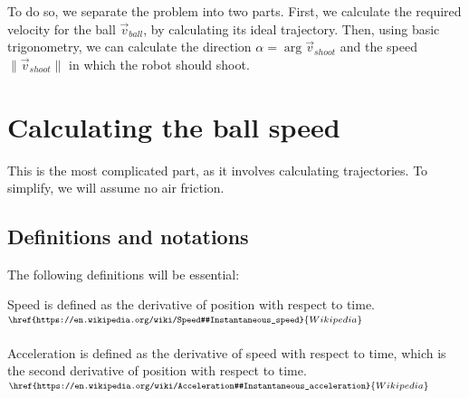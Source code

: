 \documentclass[11pt]{report}
\begin{document}
To do so, we separate the problem into two parts. First, we calculate the required velocity for the ball $\vec{v}_{ball}$, by calculating its ideal trajectory. Then, using basic trigonometry, we can calculate the direction $\alpha = \arg \vec{v}_{shoot}$ and the speed $\|\vec{v}_{shoot}\|$ in which the robot should shoot.


\section{Calculating the ball speed}

This is the most complicated part, as it involves calculating trajectories. To
simplify, we will assume no air friction.

\subsection{Definitions and notations}

The following definitions will be essential:
\begin{enumerate}[label={[\Alph*]}]
	\item\label{def:speed} Speed is defined as the derivative of position with respect to time. $^{\href{https://en.wikipedia.org/wiki/Speed#Instantaneous_speed}{Wikipedia}}$
	\item\label{def:accel} Acceleration is defined as the derivative of speed with respect to time, which is the second derivative of position with respect to time. $^{\href{https://en.wikipedia.org/wiki/Acceleration#Instantaneous_acceleration}{Wikipedia}}$
\end{enumerate}
\end{document}
